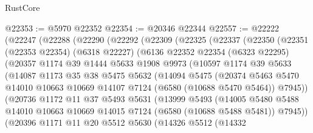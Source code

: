 \begin{lexlean}{RustCore}
\begin{coremodule}
@22353 := @5970 @22352
@22354 := @20346 @22344
@22557 := @22222
    (@22247
      (@22288
        (@22290
          (@22292
            (@22309
              (@22325
                (@22337
                  (@22350
                    (@22351
                      (@22353 @22354)
                      (@6318 @22227)
                      (@6136
                        @22352
                        @22354
                        (@6323 @22295)
                        (@20357
                          @1174
                          @39
                          @1444
                          @5633
                          @1908
                          @9973
                          (@10597
                            @1174
                            @39
                            @5633
                            (@14087
                              @1173
                              @35
                              @38
                              @5475
                              @5632
                              (@14094
                                @5475
                                (@20374
                                  @5463
                                  @5470
                                  @14010
                                  @10663
                                  @10669
                                  @14107
                                  @7124
                                  (@6580 (@10688 @5470 @5464))
                                  @7945))
                              (@20736
                                @1172
                                @11
                                @37
                                @5493
                                @5631
                                (@13999
                                  @5493
                                  (@14005
                                    @5480
                                    @5488
                                    @14010
                                    @10663
                                    @10669
                                    @14015
                                    @7124
                                    (@6580 (@10688 @5488 @5481))
                                    @7945))
                                (@20396
                                  @1171
                                  @11
                                  @20
                                  @5512
                                  @5630
                                  (@14326
                                    @5512
                                    (@14332

\end{coremodule}
\end{lexlean}
